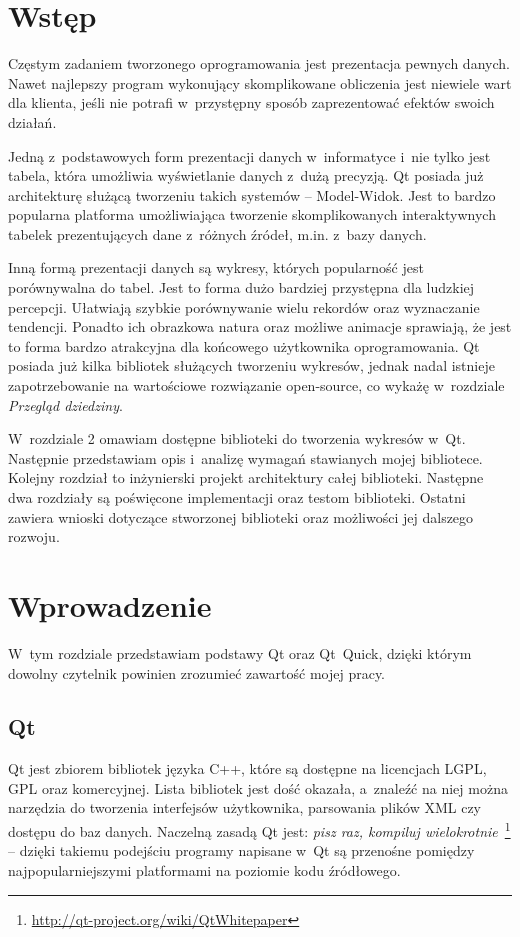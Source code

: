 \chapter*{Wstęp}
Częstym zadaniem tworzonego oprogramowania jest prezentacja pewnych danych. Nawet najlepszy program wykonujący skomplikowane obliczenia jest niewiele wart dla klienta, jeśli nie potrafi w~przystępny sposób zaprezentować efektów swoich działań.
 
Jedną z~podstawowych form prezentacji danych w~informatyce i~nie tylko jest tabela, która umożliwia wyświetlanie danych z~dużą precyzją. Qt posiada już architekturę służącą tworzeniu takich systemów -- Model-Widok. Jest to bardzo popularna platforma umożliwiająca tworzenie skomplikowanych interaktywnych tabelek prezentujących dane z~różnych źródeł, m.in. z~bazy danych.

Inną formą prezentacji danych są wykresy, których popularność jest porównywalna do tabel. Jest to forma dużo bardziej przystępna dla ludzkiej percepcji. Ułatwiają szybkie porównywanie wielu rekordów oraz wyznaczanie tendencji. Ponadto ich obrazkowa natura oraz możliwe animacje sprawiają, że jest to forma bardzo atrakcyjna dla końcowego użytkownika oprogramowania.
Qt posiada już kilka bibliotek służących tworzeniu wykresów, jednak nadal istnieje zapotrzebowanie na wartościowe rozwiązanie open-source, co wykażę w~rozdziale \textit{Przegląd dziedziny}.

W~rozdziale 2 omawiam dostępne biblioteki do tworzenia wykresów w~Qt. Następnie przedstawiam opis i~analizę wymagań stawianych mojej bibliotece. Kolejny rozdział to inżynierski projekt architektury całej biblioteki. Następne dwa rozdziały są poświęcone implementacji oraz testom biblioteki. Ostatni  zawiera wnioski dotyczące stworzonej biblioteki oraz możliwości jej dalszego rozwoju. 

\chapter{Wprowadzenie}
W~tym rozdziale przedstawiam podstawy Qt oraz Qt~Quick, dzięki którym dowolny czytelnik powinien zrozumieć zawartość mojej pracy.

\section{Qt}
Qt jest zbiorem bibliotek języka C++, które są dostępne na licencjach LGPL, GPL oraz komercyjnej. Lista bibliotek jest dość okazała, a~znaleźć na niej można narzędzia do tworzenia interfejsów użytkownika, parsowania plików XML czy dostępu do baz danych. Naczelną zasadą Qt jest: \textit{pisz raz, kompiluj wielokrotnie}~\footnote{\url{http://qt-project.org/wiki/QtWhitepaper}} -- dzięki takiemu podejściu programy napisane w~Qt są przenośne pomiędzy najpopularniejszymi platformami na poziomie kodu źródłowego.  


